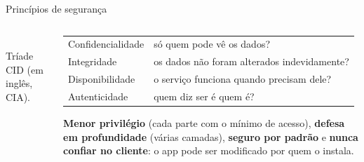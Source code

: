 \begin{frame}{Princípios de segurança}
  \begin{columns}[c]
    \begin{column}{0.42\textwidth}
      \centering
      \\[2pt]{\tiny Tríade CID (em inglês, CIA).}
    \end{column}
    \begin{column}{0.56\textwidth}
      \scriptsize
      \begin{tabularx}{\linewidth}{@{}l L@{}}
        \toprule
         &  \\
        \midrule
        Confidencialidade & só quem pode vê os dados? \\
        Integridade & os dados não foram alterados indevidamente? \\
        Disponibilidade & o serviço funciona quando precisam dele? \\
        Autenticidade & quem diz ser é quem é? \\
        \bottomrule
      \end{tabularx}
      \begin{conceito}
        \textbf{Menor privilégio} (cada parte com o mínimo de acesso), \textbf{defesa em profundidade} (várias camadas), \textbf{seguro por padrão} e \textbf{nunca confiar no cliente}: o app pode ser modificado por quem o instala.
      \end{conceito}
    \end{column}
  \end{columns}
\end{frame}


